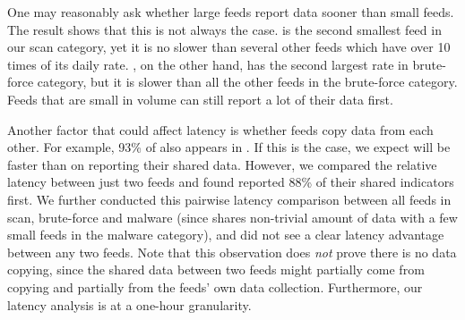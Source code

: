 
One may reasonably ask whether large feeds report data sooner than small feeds.
The result shows that this is not always the case. {\feedFBBasecamp} is the second smallest
feed in our scan category, yet it is no slower than several other feeds which have over 10 times of its daily rate.
{\feedbadipbot}, on the other hand, has the second largest rate in brute-force
category, but it is slower than all the other feeds in the brute-force category. Feeds that are small in volume can still report a lot of their data first.


Another factor that could affect latency is whether feeds copy data from each other. For example, 93\% of {\feeddangerrule} also appears in {\feedbadipssh}. If this is the case, we expect {\feeddangerrule} will be faster than {\feedbadipssh} on
reporting their shared data. However, we compared the relative latency between just two feeds and found {\feedbadipssh} reported 88\% of their shared indicators first.
We further conducted this pairwise latency comparison between all feeds in scan, brute-force
and malware (since {\feedetiprep} shares non-trivial amount of data with a
few small feeds in the malware category), and did not see a clear latency advantage between
any two feeds. Note that this observation does \emph{not} prove there is no data
copying, since the shared data between two feeds might partially come from copying and partially from the feeds' own data collection. Furthermore, our latency analysis is at a one-hour granularity.

